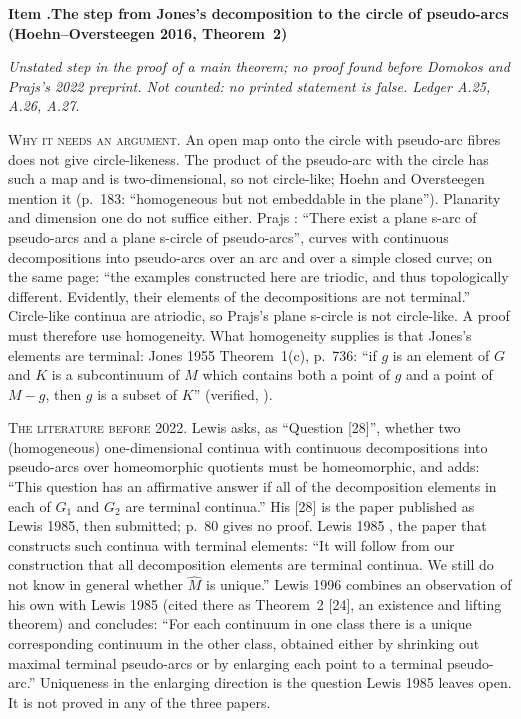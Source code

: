 \documentclass[11pt]{article}
\newcounter{defect}
\newenvironment{defect}[4]{%
  \par\addvspace{10pt}\refstepcounter{defect}%
  \noindent\textbf{Item \thedefect.\enspace #1}\par\nopagebreak
  \noindent\textit{#2}\par\nopagebreak\smallskip}{\par\addvspace{6pt}}
\newcommand{\fld}[1]{\par\noindent\textsc{#1.}\enspace}
\begin{document}
\begin{defect}{The step from Jones's decomposition to the circle of pseudo-arcs (Hoehn--Oversteegen
2016, Theorem~2)}{Unstated step in the proof of a main theorem; no proof found before
Domokos and Prajs's 2022 preprint. Not counted: no printed statement is false. Ledger A.25, A.26,
A.27.}{0}{0}
\fld{Why it needs an argument} An open map onto the circle with pseudo-arc fibres does not give
circle-likeness. The product of the pseudo-arc with the circle has such a map and is
two-dimensional, so not circle-like; Hoehn and Oversteegen mention it (p.~183: ``homogeneous but
not embeddable in the plane''). Planarity and dimension one do not suffice either. Prajs
\cite[Theorem~8, p.~1753]{P00}: ``There exist a plane s-arc of pseudo-arcs and a plane s-circle
of pseudo-arcs'', curves with continuous decompositions into pseudo-arcs over an arc and over a
simple closed curve; on the same page: ``the examples constructed here are triodic, and thus
topologically different. Evidently, their elements of the decompositions are not terminal.''
Circle-like continua are atriodic, so Prajs's plane s-circle is not circle-like. A proof must
therefore use homogeneity. What homogeneity supplies is that Jones's elements are terminal: Jones
1955 Theorem~1(c), p.~736: ``if $g$ is an element of $G$ and $K$ is a subcontinuum of $M$ which
contains both a point of $g$ and a point of $M-g$, then $g$ is a subset of $K$'' (verified,
).

\fld{The literature before 2022} Lewis \cite[p.~80]{Lw83} asks, as ``Question [28]'', whether two
(homogeneous) one-dimensional continua with continuous decompositions into pseudo-arcs over
homeomorphic quotients must be homeomorphic, and adds: ``This question has an affirmative answer if
all of the decomposition elements in each of $G_1$ and $G_2$ are terminal continua.'' His [28] is
the paper published as Lewis 1985, then submitted; p.~80 gives no proof.
Lewis 1985 \cite[p.~93]{Lw85}, the paper that constructs such continua with terminal elements:
``It will follow from our construction that all decomposition elements are terminal continua. We
still do not know in general whether $\hat M$ is unique.'' Lewis 1996 \cite[p.~173]{Lw96} combines
an observation of his own with Lewis 1985 (cited there as Theorem~2 [24], an existence and lifting
theorem) and concludes: ``For each continuum in one class there is a unique corresponding continuum
in the other class, obtained either by shrinking out maximal terminal pseudo-arcs or by enlarging
each point to a terminal pseudo-arc.'' Uniqueness in the enlarging direction is the question Lewis
1985 leaves open. It is not proved in any of the three papers.


\end{defect}
\end{document}
